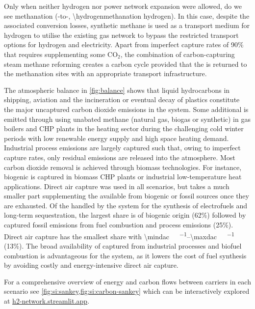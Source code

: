 Only when neither hydrogen nor power network expansion were allowed, do we see
methanation (-to-, \SI{\hydrogenmethanation}{\twh} hydrogen). In
this case, despite the associated conversion losses, synthetic methane is used
as a transport medium for hydrogen to utilise the existing gas network to bypass
the restricted transport options for hydrogen and electricity. Apart from
imperfect capture rates of 90\% that requires supplementing some CO$_2$, the
combination of carbon-capturing steam methane reforming creates a carbon cycle
provided that the \co is returned to the methanation sites with an appropriate
\co transport infrastructure.

The atmospheric \co balance in \cref{fig:balance} shows that liquid hydrocarbons
in shipping, aviation and the incineration or eventual decay of plastics
constitute the major uncaptured carbon dioxide emissions in the system. Some
additional \co is emitted through using unabated methane (natural gas, biogas or
synthetic) in gas boilers and CHP plants in the heating sector during the
challenging cold winter periods with low renewable energy supply and high space
heating demand. Industrial process emissions are largely captured such that,
owing to imperfect capture rates, only residual emissions are released into the
atmosphere. Most carbon dioxide removal is achieved through biomass
technologies. For instance, biogenic \co is captured in biomass CHP plants or
industrial low-temperature heat applications. Direct air capture was used in all
scenarios, but takes a much smaller part supplementing the \co available from
biogenic or fossil sources once they are exhausted. Of the \co handled by the
system for the synthesis of electrofuels and long-term sequestration, the
largest share is of biogenic origin (62\%) followed by captured fossil \co
emissions from fuel combustion and process emissions (25\%). Direct air capture
has the smallest share with \SIrange{\mindac}{\maxdac}{\mega\tco\per\year}
(13\%). The broad availability of captured \co from industrial processes and
biofuel combustion is advantageous for the system, as it lowers the cost of fuel
synthesis by avoiding costly and energy-intensive direct air capture.

For a comprehensive overview of energy and carbon flows between carriers in each
scenario see \cref{fig:si:sankey,fig:si:carbon-sankey} which can be
interactively explored at
\href{https://h2-network.streamlit.app}{h2-network.streamlit.app}.


